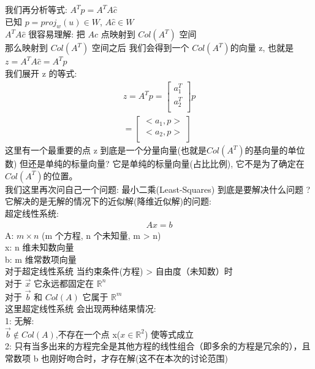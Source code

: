 \documentclass[12pt]{article}
\begin{document}
\begin{flushleft}
    我们再分析等式: $A^{T}p = A^{T}A\hat{c}$ \\
    已知 $p = proj_{w}(u) \in W$, $A\hat{c} \in W$ \\
    $A^{T}A\hat{c}$ 很容易理解: 把 $A\hat{c}$ 点映射到 $Col(A^{T})$ 空间 \\
    那么映射到  $Col(A^{T})$ 空间之后 我们会得到一个 $Col(A^{T})$的向量 z, 也就是$z = A^{T}A\hat{c} = A^{T}p$ \\
    我们展开 z 的等式: \\
    \begin{align}
        z = A^{T}p = \begin{bmatrix}
                         a_1^{T} \\
                         a_2^{T} \\
                     \end{bmatrix}p \\
        =\begin{bmatrix}
             <a_1, p> \\
             <a_2, p> \\
         \end{bmatrix}
    \end{align}
    这里有一个最重要的点 z 到底是一个分量向量(也就是$Col(A^{T})$的基向量的单位数) 但还是单纯的标量向量? 它是单纯的标量向量(占比比例), 它不是为了确定在$Col(A^{T})$的位置。 \\

    我们这里再次问自己一个问题: 最小二乘(Least-Squares) 到底是要解决什么问题 ? \\
    它解决的是无解的情况下的近似解(降维近似解)的问题: \\
    超定线性系统:
    \begin{align}
        Ax = b
    \end{align}
    A: $m \times n$ (m 个方程, n 个未知量, m > n) \\
    x: n 维未知数向量 \\
    b: m 维常数项向量 \\
    对于超定线性系统 当约束条件(方程) > 自由度（未知数）时  \\
    对于 $\vec{x}$ 它永远都固定在 $\mathbb{R}^{n}$  \\
    对于 $\vec{b}$ 和 $Col(A)$ 它属于 $\mathbb{R}^{m}$ \\
    这里超定线性系统 会出现两种结果情况: \\
    1: 无解: \\
    $\vec{b} \notin Col(A)$,不存在一个点 x($x \in \mathbb{R}^{2}$) 使等式成立 \\
    2: 只有当多出来的方程完全是其他方程的线性组合（即多余的方程是冗余的），且常数项 b 也刚好吻合时，才存在解(这不在本次的讨论范围)


\end{flushleft}
\end{document}
